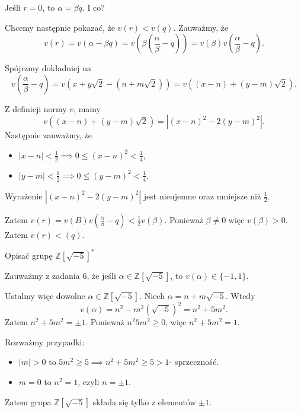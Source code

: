 \begin{solution}
	Jeśli $r = 0$, to  $\alpha = \beta q$. I co?

	Chcemy następnie pokazać, że $v\left( r \right) < v\left( q \right) $. Zauważmy, że
	\[
	v\left( r \right) = v\left( \alpha - \beta q \right) = v\left( \beta \left( \frac{\alpha }{\beta } - q \right)  \right) = v\left( \beta \right) v\left( \frac{\alpha }{\beta }- q \right) 
	.\] 

	Spójrzmy dokładniej na 
	\[
	v\left( \frac{\alpha}{\beta }- q \right) = v\left( x+y\sqrt{2} - \left( n+m\sqrt{2}  \right)   \right) = v\left( \left( x-n \right) + \left( y-m \right)\sqrt{2}  \right) 
	.\] 


	Z definicji normy $v$, mamy
	\[
        v\left( \left( x-n \right) + \left( y-m \right)\sqrt{2}\right) = \left| \left(x-n\right)^2 - 2\left(y-m\right)^2 \right| 
	.\] 
	Następnie zauważmy, że
	\begin{itemize}
		\item $\left| x-n \right| < \frac{1}{2} \implies 0 \le \left( x-n \right)^2 < \frac{1}{4}$,
		\item $\left| y-m \right| < \frac{1}{2} \implies 0 \le \left( y-m \right)^2 < \frac{1}{4}$.
	\end{itemize}

	Wyrażenie $ \left| \left(x-n\right)^2 - 2\left(y-m\right)^2 \right|$ jest nieujemne oraz mniejsze niż  $\frac{1}{2}$. 

	Zatem $v\left( r \right) = v\left( B \right) v\left( \frac{\alpha }{\beta }-q \right) < \frac{1}{2} v\left( \beta  \right) $. Ponieważ $\beta \neq 0$ więc $v\left( \beta  \right) > 0$. Zatem $v\left( r \right) < \left( q \right) $. 
\end{solution} 
\begin{problem}[8]
	Opisać grupę $\mathbb{Z} \left[ \sqrt{-5}  \right]^{\ast}$
\end{problem} 
\begin{solution}
	Zauważmy z zadania 6, że jeśli $\alpha \in \mathbb{Z} \left[ \sqrt{-5}  \right] $, to $v\left( \alpha  \right) \in \{-1,1\} $.

	Ustalmy więc dowolne $\alpha \in \mathbb{Z}\left[ \sqrt{-5}  \right] $. Niech $\alpha = n + m\sqrt{-5} $. Wtedy
	\[
	v\left( \alpha  \right) = n^2 -m^2 \left( \sqrt{-5}  \right) ^2 = n^2 + 5m^2
	.\] 
	Zatem $n^2 + 5m^2 = \pm 1$. Ponieważ $n^2 5m^2 \ge 0$, więc $n^2 + 5m^2 = 1$.

	Rozważmy przypadki:
	\begin{itemize}
		\item $\left| m \right| > 0 $ to $5m^2 \ge 5 \implies n^2 + 5m^2 \ge  5 > 1$- sprzeczność.
		\item $m = 0$ to  $n^2 = 1$, czyli $n = \pm 1$.
	\end{itemize}

	Zatem grupa $\mathbb{Z} \left[ \sqrt{-5}  \right] $ składa się tylko z elementów $\pm 1$.
\end{solution} 
